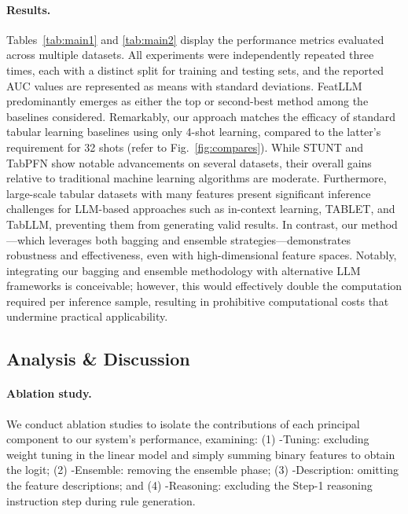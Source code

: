 \vspace*{-0.12in}
\paragraph{Results.}
Tables~\ref{tab:main1} and \ref{tab:main2} display the performance metrics evaluated across multiple datasets. All experiments were independently repeated three times, each with a distinct split for training and testing sets, and the reported AUC values are represented as means with standard deviations. \textsf{FeatLLM} predominantly emerges as either the top or second-best method among the baselines considered. Remarkably, our approach matches the efficacy of standard tabular learning baselines using only 4-shot learning, compared to the latter's requirement for 32 shots (refer to Fig.~\ref{fig:compares}). While STUNT and TabPFN show notable advancements on several datasets, their overall gains relative to traditional machine learning algorithms are moderate. Furthermore, large-scale tabular datasets with many features present significant inference challenges for LLM-based approaches such as in-context learning, TABLET, and TabLLM, preventing them from generating valid results. In contrast, our method—which leverages both bagging and ensemble strategies—demonstrates robustness and effectiveness, even with high-dimensional feature spaces. Notably, integrating our bagging and ensemble methodology with alternative LLM frameworks is conceivable; however, this would effectively double the computation required per inference sample, resulting in prohibitive computational costs that undermine practical applicability. 

\subsection{Analysis \& Discussion}
\label{sec:analysis}
\paragraph{Ablation study.} We conduct ablation studies to isolate the contributions of each principal component to our system's performance, examining: (1) \textsf{-Tuning}: excluding weight tuning in the linear model and simply summing binary features to obtain the logit; (2) \textsf{-Ensemble}: removing the ensemble phase; (3) \textsf{-Description}: omitting the feature descriptions; and (4) \textsf{-Reasoning}: excluding the Step-1 reasoning instruction step during rule generation.

